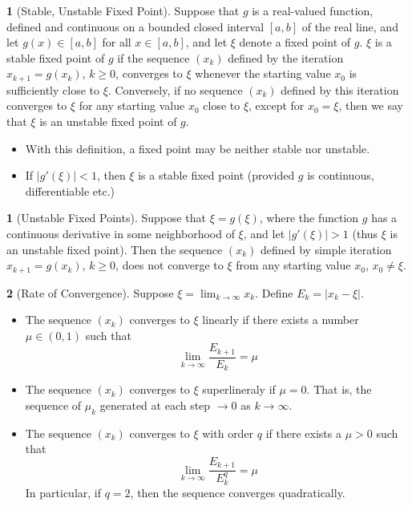 \documentclass[12pt]{article}
\theoremstyle{definition}
\newtheorem{definition}{\color{NavyBlue}{\textbf{Definition}}}
\newtheorem{theorem}{\color{ForestGreen}{\textbf{Theorem}}}
\theoremstyle{definition}
\begin{document}
\begin{definition}[Stable, Unstable Fixed Point]
Suppose that $g$ is a real-valued function, defined and continuous on a bounded closed interval $[a,b]$ of the real line, and let $g(x) \in [a,b]$ for all $x \in [a,b]$, and let $\xi$ denote a fixed point of $g$. $\xi$ is a stable fixed point of $g$ if the sequence $(x_k)$ defined by the iteration $x_{k+1} = g(x_k)$, $k\geq 0$, converges to $\xi$ whenever the starting value $x_0$ is sufficiently close to $\xi$. Conversely, if no sequence $(x_k)$ defined by this iteration converges to $\xi$ for any starting value $x_0$ close to $\xi$, except for $x_0 = \xi$, then we say that $\xi$ is an unstable fixed point of $g$. 
\end{definition}
\begin{itemize}
	\item With this definition, a fixed point may be neither stable nor unstable.
	\item If $|g'(\xi)| < 1$, then $\xi$ is a stable fixed point (provided $g$ is continuous, differentiable etc.)
\end{itemize}

\begin{theorem}[Unstable Fixed Points]
	Suppose that $\xi = g(\xi)$, where the function $g$ has a continuous derivative in some neighborhood of $\xi$, and let $|g'(\xi)| > 1$ (thus $\xi$ is an unstable fixed point). Then the sequence $(x_k)$ defined by simple iteration $x_{k+1} = g(x_k)$, $k \geq 0$, does not converge to $\xi$ from any starting value $x_0$, $x_0 \neq \xi$. 
\end{theorem}

\begin{definition}[Rate of Convergence]
Suppose $\xi = \lim_{k \to \infty} x_k$. Define $E_k = |x_k - \xi|$.
\end{definition}
\begin{itemize}
\item The sequence $(x_k)$ converges to $\xi$ linearly if there exists a number $\mu \in (0,1)$ such that 
\begin{equation}
\lim_{k \to \infty} \frac{E_{k+1}}{E_k} = \mu
\end{equation}
\item The sequence $(x_k)$ converges to $\xi$ superlineraly if $\mu = 0$. That is, the sequence of $\mu_k$ generated at each step $\rightarrow 0$ as $k \rightarrow \infty$.
\item The sequence $(x_k)$ converges to $\xi$ with order $q$ if there exists a $\mu > 0$ such that
\begin{equation}
\lim_{k \to \infty} \frac{E_{k+1}}{E_k^q} = \mu
\end{equation}
In particular, if $q=2$, then the sequence converges quadratically.
\end{itemize}
\end{document}
